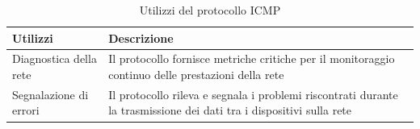 \begin{center} 
\begin{longtable}{|p{}|p{}|} 
\caption{Utilizzi del protocollo ICMP} 
\label{tabella:utilizzi:ICMP} \\
    \hline
    \textbf{Utilizzi} & \textbf{Descrizione} \\
    \hline
    Diagnostica della rete & 
    Il protocollo fornisce metriche critiche per il monitoraggio continuo delle prestazioni della rete 
    \\
    \hline 
    Segnalazione di errori & 
    Il protocollo rileva e segnala i problemi riscontrati durante la trasmissione dei dati tra i dispositivi sulla rete
    \\

\end{longtable}
\end{center}
